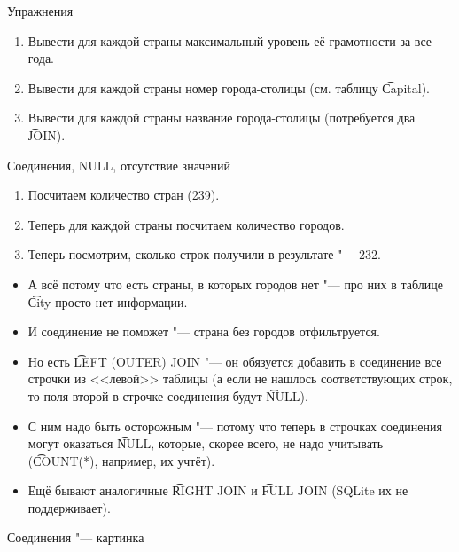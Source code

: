 \begin{frame}{Упражнения}
	\begin{enumerate}
		\item Вывести для каждой страны максимальный уровень её грамотности за все года.
		\item Вывести для каждой страны номер города-столицы (см. таблицу \t{Capital}).
		\item Вывести для каждой страны название города-столицы (потребуется два \t{JOIN}).
	\end{enumerate}
\end{frame}

\begin{frame}{Соединения, NULL, отсутствие значений}
	\begin{enumerate}
		\item Посчитаем количество стран (239).
		\item Теперь для каждой страны посчитаем количество городов.
		\item Теперь посмотрим, сколько строк получили в результате "--- 232.
	\end{enumerate}
	\begin{itemize}
		\item А всё потому что есть страны, в которых городов нет "--- про них в таблице \t{City} просто нет информации.
		\item И соединение не поможет "--- страна без городов отфильтруется.
		\item Но есть \t{LEFT (OUTER) JOIN} "--- он обязуется добавить в соединение все строчки из <<левой>> таблицы
			(а если не нашлось соответствующих строк, то поля второй в строчке соединения будут \t{NULL}).
		\item С ним надо быть осторожным "--- потому что теперь в строчках соединения могут оказаться \t{NULL},
			которые, скорее всего, не надо учитывать (\t{COUNT(*)}, например, их учтёт).
		\item Ещё бывают аналогичные \t{RIGHT JOIN} и \t{FULL JOIN} (SQLite их не поддерживает).
	\end{itemize}
\end{frame}

\begin{frame}[fragile]{Соединения "--- картинка}
\end{frame}

